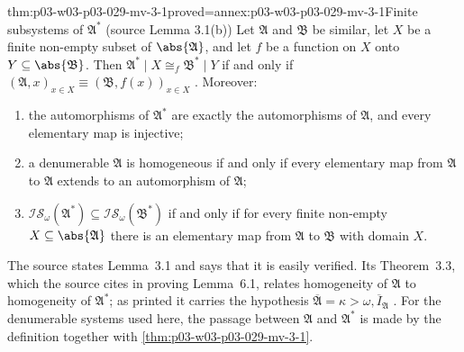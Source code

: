 \begin{hblemma}{thm:p03-w03-p03-029-mv-3-1}{proved=annex:p03-w03-p03-029-mv-3-1}{Finite subsystems of \(\mathfrak A^*\) (source Lemma 3.1(b))}
Let \(\mathfrak A\) and \(\mathfrak B\) be similar, let \(X\) be a finite
non-empty subset of \(\abs{\mathfrak A}\), and let \(f\) be a function on
\(X\) onto \(Y\subseteq\abs{\mathfrak B}\). Then
\(\mathfrak A^*\mathbin{|} X\cong_f\mathfrak B^*\mathbin{|} Y\) if and only
if \((\mathfrak A,x)_{x\in X}\equiv(\mathfrak B,f(x))_{x\in X}\)
\cite[p.~47, Lemma~3.1(b)]{MorleyVaught1962}. Moreover:
\begin{enumerate}
  \item the automorphisms of \(\mathfrak A^*\) are exactly the automorphisms
        of \(\mathfrak A\), and every elementary map is injective;
  \item a denumerable \(\mathfrak A\) is homogeneous if and only if every
        elementary map from \(\mathfrak A\) to \(\mathfrak A\) extends to an
        automorphism of \(\mathfrak A\);
  \item \(\mathscr I\mathscr S_\omega(\mathfrak A^*)\subseteq\mathscr
        I\mathscr S_\omega(\mathfrak B^*)\) if and only if for every finite
        non-empty \(X\subseteq\abs{\mathfrak A}\) there is an elementary map
        from \(\mathfrak A\) to \(\mathfrak B\) with domain \(X\).
\end{enumerate}
\end{hblemma}

The source states Lemma~3.1 and says that it is easily verified. Its
Theorem~3.3, which the source cites in proving Lemma~6.1, relates
homogeneity of \(\mathfrak A\) to homogeneity of \(\mathfrak A^*\); as
printed it carries the hypothesis \(\overline{\mathfrak A}=\kappa>\omega,
\overline{I}_{\mathfrak A}\) \cite[p.~48, Theorem~3.3]{MorleyVaught1962}. For
the denumerable systems used here, the passage between \(\mathfrak A\) and
\(\mathfrak A^*\) is made by the definition together with
\cref{thm:p03-w03-p03-029-mv-3-1}.

